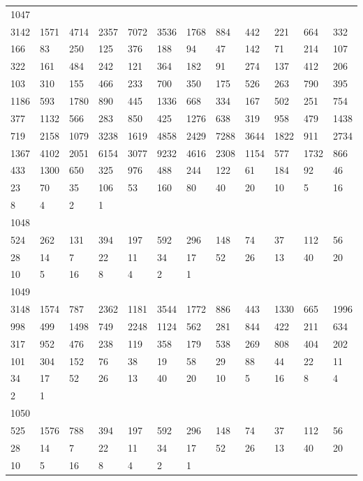 \begin{longtable}{llllllllllll}
1047&&&&&&&&&&&\\
3142& 1571& 4714& 2357& 7072& 3536& 1768& 884& 442& 221& 664& 332\\
166& 83& 250& 125& 376& 188& 94& 47& 142& 71& 214& 107\\
322& 161& 484& 242& 121& 364& 182& 91& 274& 137& 412& 206\\
103& 310& 155& 466& 233& 700& 350& 175& 526& 263& 790& 395\\
1186& 593& 1780& 890& 445& 1336& 668& 334& 167& 502& 251& 754\\
377& 1132& 566& 283& 850& 425& 1276& 638& 319& 958& 479& 1438\\
719& 2158& 1079& 3238& 1619& 4858& 2429& 7288& 3644& 1822& 911& 2734\\
1367& 4102& 2051& 6154& 3077& 9232& 4616& 2308& 1154& 577& 1732& 866\\
433& 1300& 650& 325& 976& 488& 244& 122& 61& 184& 92& 46\\
23& 70& 35& 106& 53& 160& 80& 40& 20& 10& 5& 16\\
8& 4& 2& 1& \\

1048&&&&&&&&&&&\\
524& 262& 131& 394& 197& 592& 296& 148& 74& 37& 112& 56\\
28& 14& 7& 22& 11& 34& 17& 52& 26& 13& 40& 20\\
10& 5& 16& 8& 4& 2& 1& \\

1049&&&&&&&&&&&\\
3148& 1574& 787& 2362& 1181& 3544& 1772& 886& 443& 1330& 665& 1996\\
998& 499& 1498& 749& 2248& 1124& 562& 281& 844& 422& 211& 634\\
317& 952& 476& 238& 119& 358& 179& 538& 269& 808& 404& 202\\
101& 304& 152& 76& 38& 19& 58& 29& 88& 44& 22& 11\\
34& 17& 52& 26& 13& 40& 20& 10& 5& 16& 8& 4\\
2& 1& \\

1050&&&&&&&&&&&\\
525& 1576& 788& 394& 197& 592& 296& 148& 74& 37& 112& 56\\
28& 14& 7& 22& 11& 34& 17& 52& 26& 13& 40& 20\\
10& 5& 16& 8& 4& 2& 1& \\


\end{longtable}
